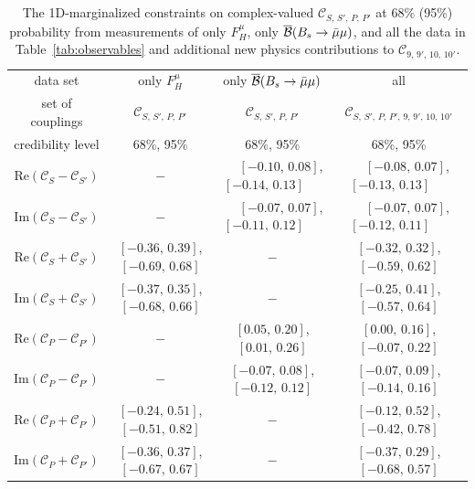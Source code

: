 \documentclass[twocolumn,epjc3]{svjour3}
\numberwithin{equation}{section}
\def \reftab#1{Table~\ref{#1}}
\newcommand{\checked}[1]{{\color{brown}{ {\bf Checked: }{#1}}}}
\renewcommand{\checked}[1]{#1}
\newcommand{\wilson}[2][{}]{\mathcal{C}_{#2}^{\mathrm{#1}}}
\renewcommand{\[}{\big[}
\renewcommand{\]}{\big]}
\renewcommand{\(}{\big(}
\renewcommand{\)}{\big)}
\begin{document}
\begin{table}
  \renewcommand{\arraystretch}{1.3}
  \begin{center}
  \begin{tabular}{cccc}
  \hline
  data set
  & only $F_H^\mu$
  & only $\overline{\cal B}(B_s \to \bar\mu\mu)$
  & all
  \\
  set of couplings
  & $\wilson{S,\,S',\,P,\,P'}$
  & $\wilson{S,\,S',\,P,\,P'}$
  & $\wilson{S,\,S',\,P,\,P',\,9,\,9',\,10,\,10'}$
  \\
  credibility level
  & 68\%, 95\%
  & 68\%, 95\%
  & 68\%, 95\%
  \\
  \hline
  $\mbox{Re}(\wilson{S} - \wilson{S'})$
  & $\quad$ $-$ $\quad$
  & $\quad$ $[-0.10,\, 0.08]$, $[-0.14,\, 0.13]$ $\quad$
  & $\quad$ $[-0.08,\, 0.07]$, $[-0.13,\, 0.13]$ $\quad$
  \\
  $\mbox{Im}(\wilson{S} - \wilson{S'})$
  & $\quad$ $-$ $\quad$
  & $\quad$ $[-0.07,\, 0.07]$, $[-0.11,\, 0.12]$ $\quad$
  & $\quad$ $[-0.07,\, 0.07]$, $[-0.12,\, 0.11]$ $\quad$
  \\[0.1cm]
  $\mbox{Re}(\wilson{S} + \wilson{S'})$
  & $[-0.36,\, 0.39]$, $[-0.69,\, 0.68]$
  & $-$
  & $[-0.32,\, 0.32]$, $[-0.59,\, 0.62]$
  \\
  $\mbox{Im}(\wilson{S} + \wilson{S'})$
  & $[-0.37,\, 0.35]$, $[-0.68,\, 0.66]$
  & $-$
  & $[-0.25,\, 0.41]$, $[-0.57,\, 0.64]$
  \\[0.1cm]
  $\mbox{Re}(\wilson{P} - \wilson{P'})$
  & $-$
  & $[ 0.05,\, 0.20]$, $[ 0.01,\, 0.26]$
  & $[ 0.00,\, 0.16]$, $[-0.07,\, 0.22]$ \hspace{-3mm}
  \\
  $\mbox{Im}(\wilson{P} - \wilson{P'})$
  & $-$
  & $[-0.07,\, 0.08]$, $[-0.12,\, 0.12]$
  & $[-0.07,\, 0.09]$, $[-0.14,\, 0.16]$
  \\[0.1cm]
  $\mbox{Re}(\wilson{P} + \wilson{P'})$
  & $[-0.24,\, 0.51]$, $[-0.51,\, 0.82]$
  & $-$
  & $[-0.12,\, 0.52]$, $[-0.42,\, 0.78]$
  \\
  $\mbox{Im}(\wilson{P} + \wilson{P'})$
  & $[-0.36,\, 0.37]$, $[-0.67,\, 0.67]$
  & $-$
  & $[-0.37,\, 0.29]$, $[-0.68,\, 0.57]$
  \\
  \hline
  \end{tabular}
  \end{center}

  \renewcommand{\arraystretch}{1.0}
  \caption{
     \label{tab:cSP:1-dimCLs}
     The 1D-marginalized constraints on complex-valued $\wilson{S,\,S',\,P,\,P'}$
     at 68\% (95\%) probability from measurements of only $F_H^\mu$,
     only $\overline{\cal B}(B_s \to \bar\mu\mu)$, and all the data in
     \reftab{tab:observables} and additional new physics contributions to
     $\wilson{9,\, 9',\, 10,\,10'}$. \checked{}
   }
\end{table}
\end{document}

